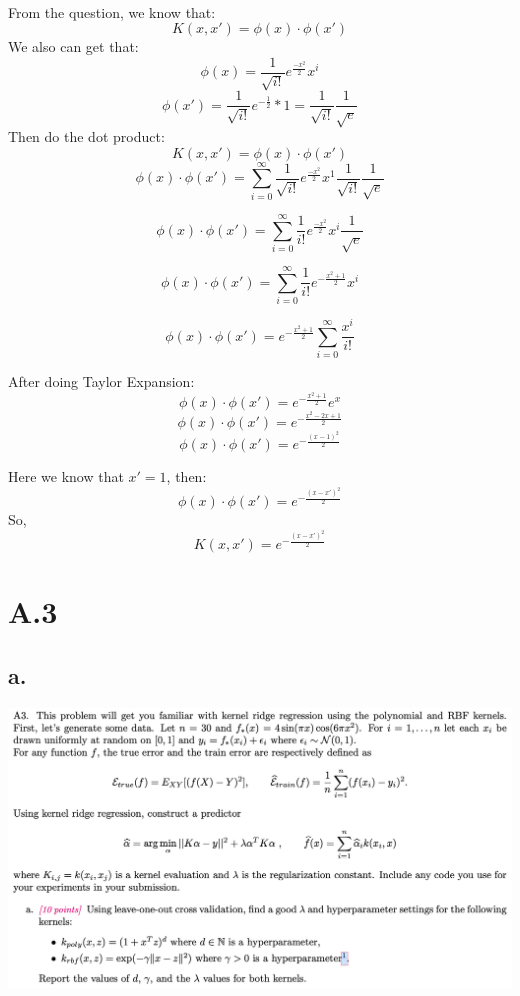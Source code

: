 \documentclass{article}
\begin{document}
 \\

From the question, we know that:
\[ K(x,x') = \phi(x) \cdot \phi(x') \]
We also can get that:
\[ \phi(x) = \frac{1}{\sqrt{i!}} e^{\frac{-x^2}{2}} x^i \]
\[ \phi(x') =  \frac{1}{\sqrt{i!}} e^{-\frac{1}{2}} * 1 = \frac{1}{\sqrt{i!}} \frac{1}{\sqrt{e}} \]
Then do the dot product:
\[ K(x,x') = \phi(x) \cdot \phi(x') \]
\[ \phi(x) \cdot \phi(x') = \sum_{i=0}^{\infty} \frac{1}{\sqrt{i!}} e^{\frac{-x^2}{2}} x^1  \frac{1}{\sqrt{i!}} \frac{1}{\sqrt{e}}  \]

\[ \phi(x) \cdot \phi(x') = \sum_{i=0}^{\infty}  \frac{1}{i!} e^{\frac{-x^2}{2}} x^i \frac{1}{\sqrt{e}} \]

\[ \phi(x) \cdot \phi(x') = \sum_{i=0}^{\infty}  \frac{1}{i!} e^{ - \frac{x^2 + 1}{2}} x^i \]

\[ \phi(x) \cdot \phi(x') = e^{ - \frac{x^2 + 1}{2}} \sum_{i=0}^{\infty}  \frac{x^i}{i!} \]

After doing Taylor Expansion:
\[ \phi(x) \cdot \phi(x') = e^{ - \frac{x^2 + 1}{2}} e^x \]
\[ \phi(x) \cdot \phi(x') = e^{ - \frac{x^2 - 2x + 1}{2}} \]
\[ \phi(x) \cdot \phi(x') = e^{ - \frac{(x-1)^2}{2}} \]

Here we know that $x' = 1$, then:
\[ \phi(x) \cdot \phi(x') = e^{ - \frac{(x-x')^2}{2}} \]
So, 
\[ K(x, x') = e^{ - \frac{(x-x')^2}{2}} \]

\section*{A.3}

\subsection*{a.}
\includegraphics[width=16cm]{img/A3a.png}
\end{document}
